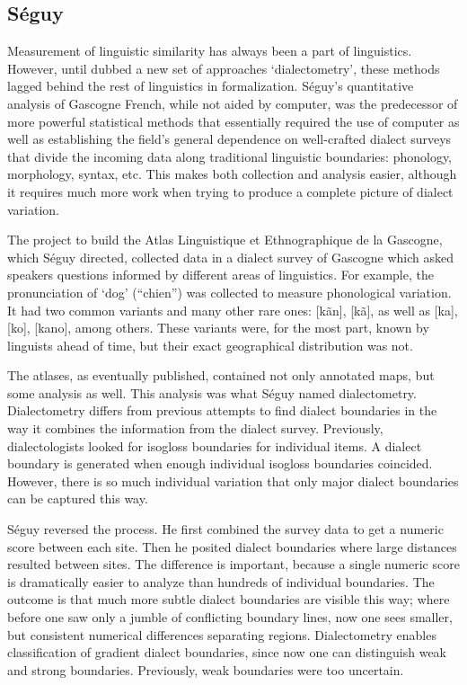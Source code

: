\documentclass[11pt]{article}
\begin{document}
\subsection{S\'eguy}
Measurement of linguistic similarity has always been a part of
linguistics. However, until  dubbed a new set of
approaches `dialectometry', these methods lagged behind the rest of
linguistics in formalization. S\'eguy's quantitative analysis
of Gascogne French, while not aided by computer, was the predecessor
of more powerful statistical methods that essentially required the use
of computer as well as establishing the field's general dependence on
well-crafted dialect surveys that divide the incoming data along
traditional linguistic boundaries: phonology, morphology, syntax, etc.
This makes both collection and analysis easier, although it requires
much more work when trying to produce a complete picture of dialect
variation.

The project to build the Atlas Linguistique et Ethnographique de la
Gascogne, which S\'eguy directed, collected data in a dialect survey
of Gascogne which asked speakers questions informed by different areas
of linguistics. For example, the pronunciation of `dog' (``chien'')
was collected to measure phonological variation. It had two common
variants and many other rare ones: [k\~an], [k\~a], as well as [ka],
[ko], [kano], among others. These variants were, for the most part,
known by linguists ahead of time, but their exact geographical
distribution was not.

The atlases, as eventually published, contained not only annotated
maps, but some analysis as well. This analysis was what S\'eguy named
dialectometry. Dialectometry differs from previous attempts to find
dialect boundaries in the way it combines the information from the
dialect survey. Previously, dialectologists looked for isogloss
boundaries for individual items. A dialect boundary is generated when
enough individual isogloss boundaries coincided. However, there is so
much individual variation that only major dialect boundaries can
be captured this way.

S\'eguy reversed the process. He first combined the survey data to get
a numeric score between each site. Then he posited dialect boundaries
where large distances resulted between sites. The difference is
important, because a single numeric score is dramatically easier to
analyze than hundreds of individual boundaries. The outcome is that
much more subtle dialect boundaries are visible this way; where before
one saw only a jumble of conflicting boundary lines, now one sees
smaller, but consistent numerical differences separating regions. {Dialectometry
  enables classification of gradient dialect boundaries, since now one
can distinguish weak and strong boundaries. Previously, weak
boundaries were too uncertain.}
\end{document}

